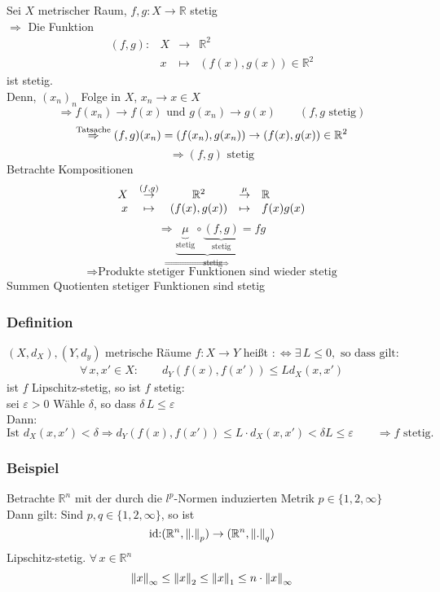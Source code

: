  Sei $X$ metrischer Raum, $f,g:X \to \mathbb{R}$ stetig \\
 $\Rightarrow $ 
 Die Funktion 
 \[
 \begin{array}{rccl}
 	(f,g): &X &\to &\mathbb{R}^2 \\
	&x &\mapsto &(f(x),g(x))\in \mathbb{R}^2
 \end{array}
 \]
 ist stetig. \\
 Denn, $(x_n)_n $ Folge in $X$, $x_n \to x \in X$ \\ 
 \[
 	\Rightarrow f(x_n) \to f(x) \text{ und } g(x_n) \to g(x) \qquad (f,g \text{ stetig})
 \]
 \[
 	\stackrel{\text{Tatsache}}{\Rightarrow } (f,g)(x_n)=(f(x_n),g(x_n)) \to (f(x),g(x)) \in \mathbb{R}^2 \\
 \]
 \[
	\Rightarrow (f,g) \text{ stetig}
 \]
 Betrachte Kompositionen 
 \[
 \begin{array}{rcccl}
 	X &\stackrel{(f,g)}{\to }  &\mathbb{R}^2 &\stackrel{\mu}{\to } &\mathbb{R} \\
	x &\stackrel{\hphantom{(f,g)}}{\mapsto } &(f(x),g(x)) &\mapsto &f(x)g(x) \\
 \end{array}
 \]
 \[
 	\Rightarrow \underset{\text{$\Rightarrow$ stetig}}{\underbrace{ \underset{\text{stetig}}{\underbrace{\mu}} \circ \underset{\text{stetig}}{\underbrace{(f,g)}} }}
	= fg
 \] 
 \[
 	\Rightarrow \text{Produkte stetiger Funktionen sind wieder stetig}
 \]
  Summen Quotienten stetiger Funktionen sind stetig
\subsubsection[Lipschitz-stetig]{Definition} %
\label{ssub:definition}
$(X,d_X),(Y,d_y)$ metrische Räume $f:X \to Y$ heißt  
$:\Leftrightarrow \exists \, L \leq 0, \text{ so dass gilt: }$
\begin{align*}
	 \forall\, x,x' \in X : \qquad 
	 d_Y(f(x),f(x')) \leq Ld_X(x,x')
\end{align*}
 ist $f$ Lipschitz-stetig, so ist $f$ stetig: \\
sei $\varepsilon > 0$ Wähle $\delta$, so dass $\delta\,L \leq \varepsilon$ \\
Dann:
\[
	\text{Ist } d_X(x,x')<\delta \Rightarrow d_Y(f(x),f(x')) \leq L \cdot d_X(x,x') < \delta L \leq \varepsilon \qquad \Rightarrow f \text{ stetig.} 
\]

\subsubsection[Beispiel Lipschitz-stetig]{Beispiel} %
\label{ssub:beispiel}
Betrachte $\mathbb{R}^n$ mit der durch die $l^p$-Normen induzierten Metrik $p \in \{1,2,\infty\}$ \\
Dann gilt: Sind $p,q \in \{1,2,\infty\}$, so ist 
\[
	\text{id:}(\mathbb{R}^n,\norm{.}_p) \to (\mathbb{R}^n,\norm{.}_q) 
\] 
Lipschitz-stetig.
 $\forall\, x \in \mathbb{R}^n$
\[
	\norm{x}_{\infty} \leq \norm{x}_2 \leq \norm{x}_1 \leq n \cdot \norm{x}_{\infty}
\]
